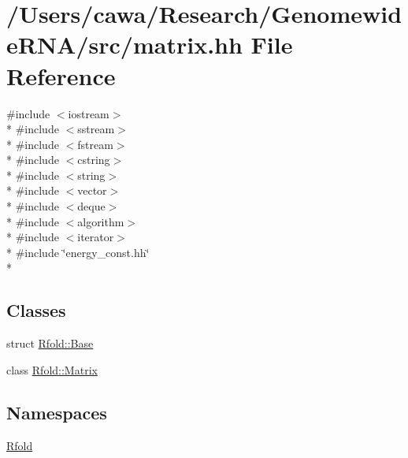 \hypertarget{matrix_8hh}{\section{/\+Users/cawa/\+Research/\+Genomewide\+R\+N\+A/src/matrix.hh File Reference}
\label{matrix_8hh}
}
{\ttfamily \#include $<$iostream$>$}\\*
{\ttfamily \#include $<$sstream$>$}\\*
{\ttfamily \#include $<$fstream$>$}\\*
{\ttfamily \#include $<$cstring$>$}\\*
{\ttfamily \#include $<$string$>$}\\*
{\ttfamily \#include $<$vector$>$}\\*
{\ttfamily \#include $<$deque$>$}\\*
{\ttfamily \#include $<$algorithm$>$}\\*
{\ttfamily \#include $<$iterator$>$}\\*
{\ttfamily \#include \char`\"{}energy\+\_\+const.\+hh\char`\"{}}\\*
\subsection*{Classes}
\begin{DoxyCompactItemize}
\item 
struct \hyperlink{struct_rfold_1_1_base}{Rfold\+::\+Base}
\item 
class \hyperlink{class_rfold_1_1_matrix}{Rfold\+::\+Matrix}
\end{DoxyCompactItemize}
\subsection*{Namespaces}
\begin{DoxyCompactItemize}
\item 
 \hyperlink{namespace_rfold}{Rfold}
\end{DoxyCompactItemize}
